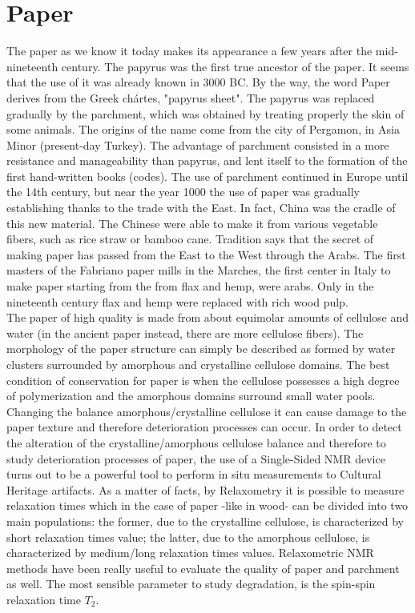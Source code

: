\documentclass[a4paper,11pt]{report}
\begin{document}
\section{Paper}
The paper as we know it today makes its appearance a few years after the mid-nineteenth century. The papyrus was the first true ancestor of the paper. It seems that the use of it was already known in 3000 BC. By the way, the word Paper derives from the Greek chártes, "papyrus sheet". The papyrus was replaced gradually by the parchment, which was obtained by treating properly the skin of some animals. The origins of the name come from the city of Pergamon, in Asia Minor (present-day Turkey). The advantage of parchment consisted in a more resistance and manageability than papyrus, and lent itself to the formation of the first hand-written books (codes). The use of parchment continued in Europe until the 14th century, but near the year 1000 the use of paper was gradually establishing thanks to the trade with the East. In fact, China was the cradle of this new material. The Chinese were able to make it from various vegetable fibers, such as rice straw or bamboo cane. Tradition says that the secret of making paper has passed from the East to the West through the Arabs. The first masters of the Fabriano paper mills in the Marches, the first center in Italy to make paper starting from the from flax and hemp, were arabs. Only in the nineteenth century flax and hemp were replaced with rich wood pulp.\\
The paper of high quality is made from about equimolar amounts of cellulose and water (in the ancient paper instead, there are more cellulose fibers). The morphology of the paper structure can simply be described as formed by water clusters surrounded by amorphous and crystalline cellulose domains\cite{duepaper}. The best condition of conservation for paper is when the cellulose possesses a high degree of polymerization and the amorphous domains surround small water pools. Changing the balance amorphous/crystalline cellulose it can cause damage to the paper texture and therefore deterioration processes can occur. In order to detect the alteration of the crystalline/amorphous cellulose balance and therefore to study deterioration processes of paper, the use of a Single-Sided NMR device turns out to be a powerful tool to perform in situ measurements to Cultural Heritage artifacts. As a matter of facts, by Relaxometry it is possible to measure relaxation times which in the case of paper -like in wood-  can be divided into two main populations: the former, due to the crystalline cellulose, is characterized by short relaxation times value; the latter, due to the amorphous cellulose, is characterized by medium/long relaxation times values. Relaxometric NMR methods have been really useful to evaluate the quality of paper and parchment as well. The most sensible parameter to study degradation, is the spin-spin relaxation time $T_2$.\\
\end{document}
